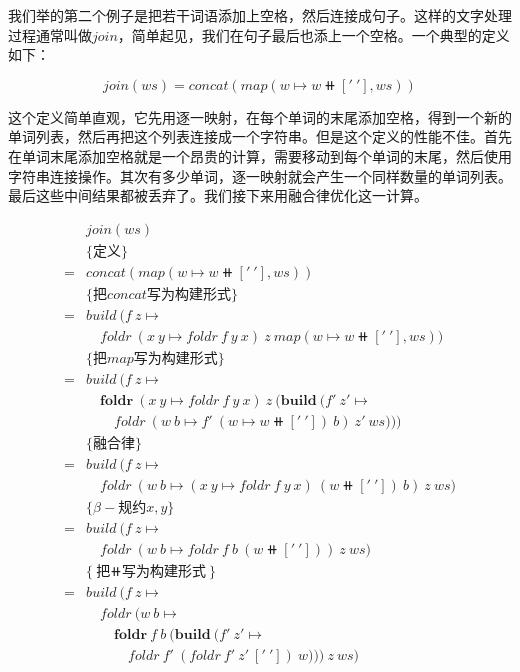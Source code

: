 \documentclass{article}
\begin{document}
\begin{example}
我们举的第二个例子是把若干词语添加上空格，然后连接成句子。这样的文字处理过程通常叫做$join$，简单起见，我们在句子最后也添上一个空格。一个典型的定义如下：

\[
join(ws) = concat(map(w \mapsto w \doubleplus ['\ '], ws))
\]

这个定义简单直观，它先用逐一映射，在每个单词的末尾添加空格，得到一个新的单词列表，然后再把这个列表连接成一个字符串。但是这个定义的性能不佳。首先在单词末尾添加空格就是一个昂贵的计算，需要移动到每个单词的末尾，然后使用字符串连接操作。其次有多少单词，逐一映射就会产生一个同样数量的单词列表。最后这些中间结果都被丢弃了。我们接下来用融合律优化这一计算。

\[ \begin{array}{rl}
  & join(ws) \\
  & \{\text{定义} \} \\
= & concat(map(w \mapsto w \doubleplus ['\ '], ws)) \\

  & \{\text{把$concat$写为构建形式}\} \\
= & build\ (f\ z \mapsto \\
  & \quad foldr\ (x\ y \mapsto foldr\ f\ y\ x)\ z\ map(w \mapsto w \doubleplus ['\ '], ws)) \\

  & \{\text{把$map$写为构建形式}\} \\
= & build\ (f\ z \mapsto \\
  & \quad \pmb{foldr}\ (x\ y \mapsto foldr\ f\ y\ x)\ z\ (\pmb{build}\ (f'\ z' \mapsto \\
  & \quad \quad foldr\ (w\ b \mapsto f'\ (w \mapsto w \doubleplus ['\ '])\ b)\ z'\ ws))) \\

  & \{\text{融合律}\} \\
= & build\ (f\ z \mapsto \\
  & \quad foldr\ (w\ b \mapsto (x\ y \mapsto foldr\ f\ y\ x)\ (w \doubleplus ['\ '])\ b)\ z\ ws) \\

  & \{\beta-\text{规约}x, y\} \\
= & build\ (f\ z \mapsto \\
  & \quad foldr\ (w\ b \mapsto foldr\ f\ b\ (w \doubleplus ['\ ']))\ z\ ws) \\

  & \{\text{把$\doubleplus$写为构建形式}\} \\
= & build\ (f\ z \mapsto \\
  & \quad foldr\ (w\ b \mapsto \\
  & \quad \quad \pmb{foldr}\ f\ b\ (\pmb{build}\ (f'\ z' \mapsto \\
  & \quad \quad \quad foldr\ f'\ (foldr\ f'\ z'\ ['\ '])\ w)))\ z\ ws) \\


\end{array}\]
\end{example}
\end{document}
